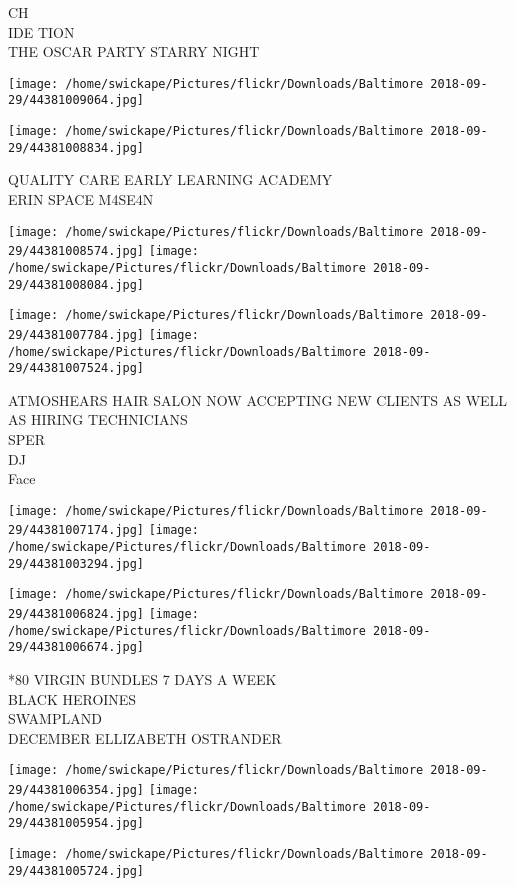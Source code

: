\documentclass[10pt,letterpaper]{article}
\begin{document}
CH\\
IDE TION\\
THE OSCAR PARTY STARRY NIGHT
\pagebreak

\texttt{[image: /home/swickape/Pictures/flickr/Downloads/Baltimore 2018-09-29/44381009064.jpg]}

\vspace{0.25in}
\texttt{[image: /home/swickape/Pictures/flickr/Downloads/Baltimore 2018-09-29/44381008834.jpg]}

QUALITY CARE EARLY LEARNING ACADEMY\\
ERIN SPACE M4SE4N
\pagebreak

\texttt{[image: /home/swickape/Pictures/flickr/Downloads/Baltimore 2018-09-29/44381008574.jpg]}
\texttt{[image: /home/swickape/Pictures/flickr/Downloads/Baltimore 2018-09-29/44381008084.jpg]}

\texttt{[image: /home/swickape/Pictures/flickr/Downloads/Baltimore 2018-09-29/44381007784.jpg]}
\texttt{[image: /home/swickape/Pictures/flickr/Downloads/Baltimore 2018-09-29/44381007524.jpg]}

ATMOSHEARS HAIR SALON NOW ACCEPTING NEW CLIENTS AS WELL AS HIRING TECHNICIANS\\
SPER\\
DJ\\
Face
\pagebreak

\texttt{[image: /home/swickape/Pictures/flickr/Downloads/Baltimore 2018-09-29/44381007174.jpg]}
\texttt{[image: /home/swickape/Pictures/flickr/Downloads/Baltimore 2018-09-29/44381003294.jpg]}

\texttt{[image: /home/swickape/Pictures/flickr/Downloads/Baltimore 2018-09-29/44381006824.jpg]}
\texttt{[image: /home/swickape/Pictures/flickr/Downloads/Baltimore 2018-09-29/44381006674.jpg]}

*80 VIRGIN BUNDLES 7 DAYS A WEEK\\
BLACK HEROINES\\
SWAMPLAND\\
DECEMBER ELLIZABETH OSTRANDER
\pagebreak

\texttt{[image: /home/swickape/Pictures/flickr/Downloads/Baltimore 2018-09-29/44381006354.jpg]}
\texttt{[image: /home/swickape/Pictures/flickr/Downloads/Baltimore 2018-09-29/44381005954.jpg]}

\texttt{[image: /home/swickape/Pictures/flickr/Downloads/Baltimore 2018-09-29/44381005724.jpg]}
\end{document}
